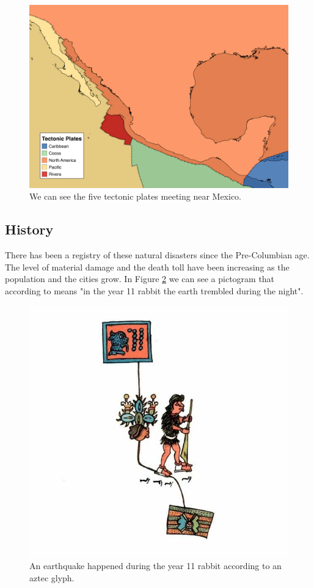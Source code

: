 \begin{figure}[h]
  \centering
  \includegraphics[width=1\textwidth]{images/plates.png}
  \caption{We can see the five tectonic plates meeting near Mexico.}
  \label{fig:plates}
\end{figure}


\subsection{History}

There has been a registry of these natural disasters since the Pre-Columbian age. The level of material damage and the death toll have been increasing as the population and the cities grow. In Figure \ref{fig:pictogram} we can see a pictogram that according to \cite{sismosmexico} means "in the year 11 rabbit the earth trembled during the night".\\


\begin{figure}[h]
  \centering
  \includegraphics[width=1\textwidth]{images/codice.jpg}
  \caption{An earthquake happened during the year 11 rabbit according to an aztec glyph.}
  \label{fig:pictogram}
\end{figure}


